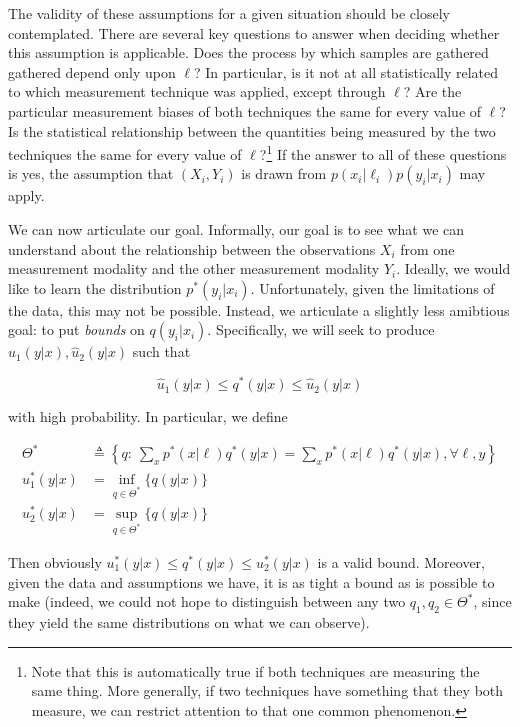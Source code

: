 The validity of these assumptions for a given situation should be closely contemplated.  There are several key questions to answer when deciding whether this assumption is applicable.  Does the process by which samples are gathered gathered depend only upon $\ell$?  In particular, is it not at all statistically related to which measurement technique was  applied, except through $\ell$?  Are the particular measurement biases of both techniques the same for every value of $\ell$?  Is the statistical relationship between the quantities being measured by the two techniques the same for every value of $\ell$?\footnote{Note that this is automatically true if both techniques are measuring the same thing.  More generally, if two techniques have something that they both measure, we can restrict attention to that one common phenomenon.}  If the answer to all of these questions is yes, the assumption that $(X_i,Y_i)$ is drawn from $p(x_i|\ell_i)p(y_i|x_i)$ may apply.

We can now articulate our goal.  Informally, our goal is to see what we can understand about the relationship between the observations $X_i$ from one measurement modality and the other measurement modality $Y_i$.  Ideally, we would like to learn the distribution $p^*(y_i|x_i)$.  Unfortunately, given the limitations of the data, this may not be possible.  Instead, we articulate a slightly less amibtious goal: to put \emph{bounds} on $q(y_i|x_i)$.  Specifically, we will seek to produce $\hat u_1(y|x),\hat u_2(y|x)$ such that

\begin{equation}\label{eq:ubound}
\hat u_1(y|x) \leq q^*(y|x) \leq \hat u_2(y|x)
\end{equation}

with high probability.  In particular, we define

\begin{align*}
\Theta^* &\triangleq\left\{q:\ \sum_x p^*(x|\ell) q^*(y|x) =\sum_x p^*(x|\ell)q^*(y|x), \forall \ell,y\right\}\\ 
u_1^*(y|x) &= \inf_{q\in\Theta^*} \{q(y|x)\} \\
u_2^*(y|x) &= \sup_{q\in\Theta^*} \{q(y|x)\}
\end{align*}

Then obviously $u_1^*(y|x) \leq q^*(y|x)\leq u_2^*(y|x)$ is a valid bound.  Moreover, given the data and assumptions we have, it is as tight a bound as is possible to make (indeed, we could not hope to distinguish between any two $q_1,q_2 \in \Theta^*$, since they yield the same distributions on what we can observe).

